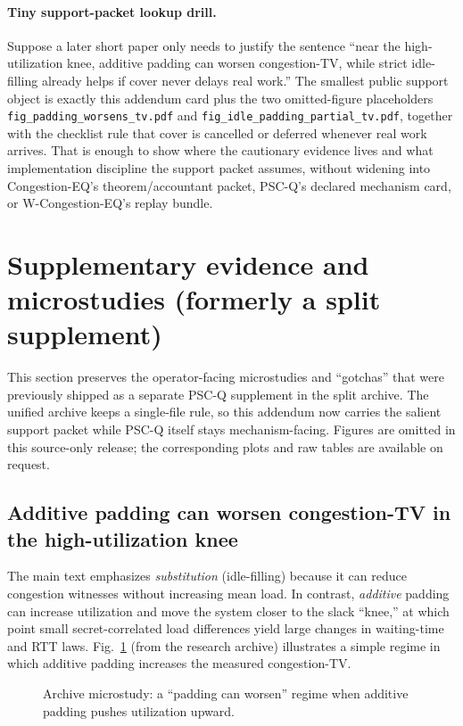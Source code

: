 \documentclass[11pt]{article}
\theoremstyle{definition}
\theoremstyle{remark}
\begin{document}
\paragraph{Tiny support-packet lookup drill.}
Suppose a later short paper only needs to justify the sentence ``near the high-utilization knee, additive padding can worsen congestion-TV, while strict idle-filling already helps if cover never delays real work.''
The smallest public support object is exactly this addendum card plus the two omitted-figure placeholders \texttt{fig\_padding\_worsens\_tv.pdf} and \texttt{fig\_idle\_padding\_partial\_tv.pdf}, together with the checklist rule that cover is cancelled or deferred whenever real work arrives.
That is enough to show where the cautionary evidence lives and what implementation discipline the support packet assumes, without widening into Congestion-EQ's theorem/accountant packet, PSC-Q's declared mechanism card, or W-Congestion-EQ's replay bundle.

\section{Supplementary evidence and microstudies (formerly a split supplement)}\label{app:microstudies}
This section preserves the operator-facing microstudies and ``gotchas'' that were previously shipped as a separate PSC-Q supplement in the split archive. The unified archive keeps a single-file rule, so this addendum now carries the salient support packet while PSC-Q itself stays mechanism-facing. Figures are omitted in this source-only release; the corresponding plots and raw tables are available on request.

\subsection{Additive padding can worsen congestion-TV in the high-utilization knee}
The main text emphasizes \emph{substitution} (idle-filling) because it can reduce congestion witnesses without increasing mean load.
In contrast, \emph{additive} padding can increase utilization and move the system closer to the slack ``knee,''
at which point small secret-correlated load differences yield large changes in waiting-time and RTT laws.
Fig.~\ref{fig:worsens} (from the research archive) illustrates a simple regime in which additive padding increases the measured congestion-TV.

\begin{figure}[t]
\centering
{}
\caption{Archive microstudy: a ``padding can worsen'' regime when additive padding pushes utilization upward.}
\label{fig:worsens}
\end{figure}
\end{document}
